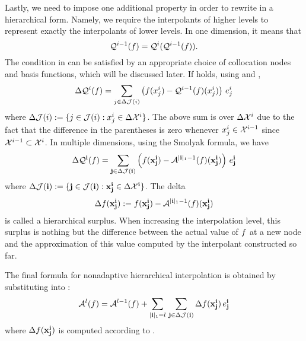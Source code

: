 Lastly, we need to impose one additional property in order to rewrite
 in a hierarchical form. Namely, we require the
interpolants of higher levels to represent exactly the interpolants of lower
levels. In one dimension, it means that
\begin{equation} \elab{tensor-exactness}
  \tensor{i - 1}(\f) = \tensor{i}(\tensor{i - 1}(\f)).
\end{equation}
The condition in  can be satisfied by an appropriate
choice of collocation nodes and basis functions, which will be discussed later.
If  holds, using  and
,
\[
  \Delta\mathcal{Q}^{i}(f) = \sum_{j \in \Delta\mathcal{J}(i)} \left( f(x^i_j) - \mathcal{Q}^{i - 1}(f)(x^i_j) \right) \, e^i_j
\]
where $\Delta\mathcal{J}(i) := \{ j \in \mathcal{J}(i): x^i_j \in \Delta\mathcal{X}^i \}$. The
above sum is over $\Delta\mathcal{X}^i$ due to the fact that the difference in the
parentheses is zero whenever $x^i_j \in \mathcal{X}^{i - 1}$ since $\mathcal{X}^{i - 1} \subset
\mathcal{X}^i$. In multiple dimensions, using the Smolyak formula, we have
\begin{equation} \elab{tensor-delta}
  \Delta\tensor{\vi}(\f) = \sum_{\vj \in \Delta\index(\vi)} \left( \f(\vx^\vi_\vj) - \smolyak{|\vi|_1 - 1}(\f)(\vx^\vi_\vj) \right) \, \e^\vi_\vj
\end{equation}
where $\Delta\mathcal{J}(\mathbf{i}) := \{ \mathbf{j} \in \mathcal{J}(\mathbf{i}): \mathbf{x}^{\mathbf{i}}_{\mathbf{j}} \in \Delta\mathcal{X}^{\mathbf{i}}
\}$. The delta
\begin{equation} \elab{surplus}
  \surplus(\vx^\vi_\vj) := \f(\vx^\vi_\vj) - \smolyak{|\vi|_1 - 1}(\f)(\vx^\vi_\vj)
\end{equation}
is called a hierarchical surplus. When increasing the interpolation level, this
surplus is nothing but the difference between the actual value of $f$ at a new
node and the approximation of this value computed by the interpolant constructed
so far.

The final formula for nonadaptive hierarchical interpolation is obtained by
substituting  into :
\begin{equation} \elab{smolyak-hierarchical}
  \smolyak{l}(\f) = \smolyak{l-1}(\f) + \sum_{|\vi|_1 = l} \, \sum_{\vj \in \Delta\index(\vi)} \surplus(\vx^\vi_\vj) \, \e^\vi_\vj
\end{equation}
where $\Delta f(\mathbf{x}^{\mathbf{i}}_{\mathbf{j}})$ is computed according to .
